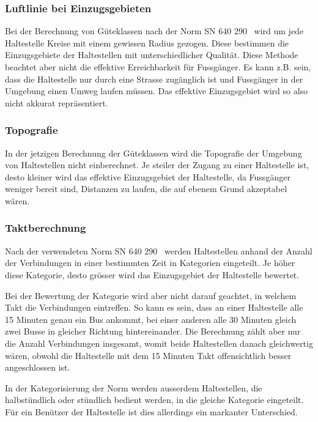 \subsubsection{Luftlinie bei Einzugsgebieten}
\label{problem:Luftlinie bei Einzugsgebieten}

Bei der Berechnung von Güteklassen nach der Norm SN 640 290~\cite{sn640290} wird um jede Haltestelle Kreise mit einem gewissen Radius gezogen.
Diese bestimmen die Einzugsgebiete der Haltestellen mit unterschiedlicher Qualität.
Diese Methode beachtet aber nicht die effektive Erreichbarkeit für Fussgänger.
Es kann z.B. sein, dass die Haltestelle nur durch eine Strasse zugänglich ist und Fussgänger in der Umgebung einen Umweg laufen müssen.
Das effektive Einzugsgebiet wird so also nicht akkurat repräsentiert.

\subsubsection{Topografie}
\label{problem:Topografie}

In der jetzigen Berechnung der Güteklassen wird die Topografie der Umgebung von Haltestellen nicht einberechnet.
Je steiler der Zugang zu einer Haltestelle ist, desto kleiner wird das effektive Einzugsgebiet der Haltestelle, da Fussgänger weniger bereit sind, Distanzen zu laufen, die auf ebenem Grund akzeptabel wären.

\subsubsection{Taktberechnung}
\label{problem:Taktberechnung}

Nach der verwendeten Norm SN 640 290~\cite{sn640290} werden Haltestellen anhand der Anzahl der Verbindungen in einer bestimmten Zeit in Kategorien eingeteilt.
Je höher diese Kategorie, desto grösser wird das Einzugsgebiet der Haltestelle bewertet.

Bei der Bewertung der Kategorie wird aber nicht darauf geachtet, in welchem Takt die Verbindungen eintreffen.
So kann es sein, dass an einer Haltestelle alle 15 Minuten genau ein Bus ankommt, bei einer anderen alle 30 Minuten gleich zwei Busse in gleicher Richtung hintereinander.
Die Berechnung zählt aber nur die Anzahl Verbindungen insgesamt, womit beide Haltestellen danach gleichwertig wären, obwohl die Haltestelle mit dem 15 Minuten Takt offensichtlich besser angeschlossen ist.

In der Kategorisierung der Norm werden ausserdem Haltestellen, die halbstündlich oder stündlich bedient werden, in die gleiche Kategorie eingeteilt.
Für ein Benützer der Haltestelle ist dies allerdings ein markanter Unterschied.

